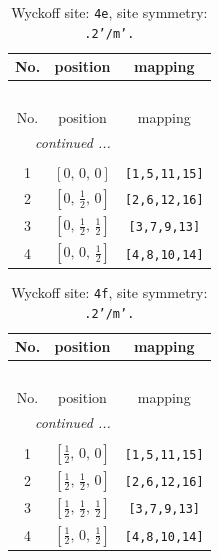 \documentclass[fleqn,8pt]{jsarticle}
\begin{document}
\renewcommand{\arraystretch}{1.2}
\begin{longtable}{ccc}
\caption{Wyckoff site: {\tt 4e}, site symmetry: {\tt .2'/m'.}}
 \\
 \hline \hline
No. & position & mapping \\ \hline \endfirsthead

\multicolumn{2}{l}{\tablename\ \thetable{}} \\
 \hline \hline
No. & position & mapping \\ \hline \endhead

 \hline \hline
\multicolumn{2}{r}{\footnotesize\it continued ...} \\ \endfoot

 \hline \hline
\multicolumn{2}{r}{} \\ \endlastfoot

1 & $\left[ 0,\, 0,\, 0 \right]$ & {\tt [1,5,11,15]} \\ \hline
2 & $\left[ 0,\, \frac{1}{2},\, 0 \right]$ & {\tt [2,6,12,16]} \\ \hline
3 & $\left[ 0,\, \frac{1}{2},\, \frac{1}{2} \right]$ & {\tt [3,7,9,13]} \\ \hline
4 & $\left[ 0,\, 0,\, \frac{1}{2} \right]$ & {\tt [4,8,10,14]} \\
\end{longtable}
\renewcommand{\arraystretch}{1.2}
\begin{longtable}{ccc}
\caption{Wyckoff site: {\tt 4f}, site symmetry: {\tt .2'/m'.}}
 \\
 \hline \hline
No. & position & mapping \\ \hline \endfirsthead

\multicolumn{2}{l}{\tablename\ \thetable{}} \\
 \hline \hline
No. & position & mapping \\ \hline \endhead

 \hline \hline
\multicolumn{2}{r}{\footnotesize\it continued ...} \\ \endfoot

 \hline \hline
\multicolumn{2}{r}{} \\ \endlastfoot

1 & $\left[ \frac{1}{2},\, 0,\, 0 \right]$ & {\tt [1,5,11,15]} \\ \hline
2 & $\left[ \frac{1}{2},\, \frac{1}{2},\, 0 \right]$ & {\tt [2,6,12,16]} \\ \hline
3 & $\left[ \frac{1}{2},\, \frac{1}{2},\, \frac{1}{2} \right]$ & {\tt [3,7,9,13]} \\ \hline
4 & $\left[ \frac{1}{2},\, 0,\, \frac{1}{2} \right]$ & {\tt [4,8,10,14]} \\
\end{longtable}
\end{document}
